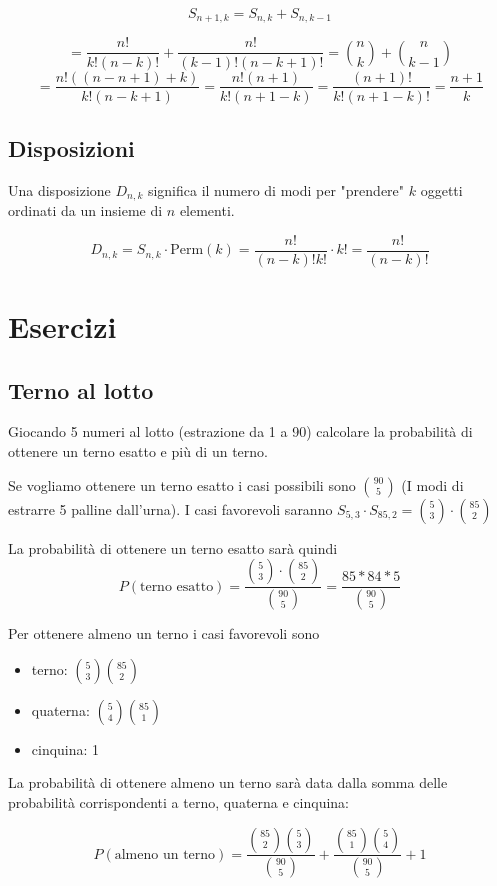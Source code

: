 \[ S_{n+1,k} = S_{n,k} + S_{n,k-1} \]

\[ = \dfrac{n!}{k!(n-k)!} + \dfrac{n!}{(k-1)!(n-k+1)!} = \binom{n}{k} + \binom{n}{k-1} \]
\[ = \dfrac{n!((n-n+1) + k)}{k!(n-k+1)} = \dfrac{n!(n+1)}{k!(n+1-k)} = \dfrac{(n+1)!}{k!(n+1-k)!} = \dfrac{n+1}{k} \]
\enddim

\subsection{Disposizioni}
Una disposizione $ D_{n,k} $ significa il numero di modi per "prendere" $ k $ oggetti ordinati da un insieme di $ n $ elementi.

\[ D_{n,k} = S_{n,k} \cdot \text{Perm}(k) = \dfrac{n!}{(n-k)!k!} \cdot k! = \dfrac{n!}{(n-k)!} \]

\section{Esercizi}

\subsection{Terno al lotto}
Giocando 5 numeri al lotto (estrazione da 1 a 90) calcolare la probabilità di ottenere un terno esatto e più di un terno.

Se vogliamo ottenere un terno esatto i casi possibili sono $ \binom{90}{5} $ (I modi di estrarre 5 palline dall'urna). I casi favorevoli saranno $ S_{5,3} \cdot S_{85,2} = \binom{5}{3} \cdot \binom{85}{2}$

La probabilità di ottenere un terno esatto sarà quindi
\[ P(\text{terno esatto}) = \dfrac{\binom{5}{3} \cdot \binom{85}{2}}{\binom{90}{5}} = \dfrac{85 * 84 * 5}{\binom{90}{5}} \]

Per ottenere almeno un terno i casi favorevoli sono
\begin{itemize}
	\item terno: $ \binom{5}{3} \binom{85}{2} $
	\item quaterna: $ \binom{5}{4} \binom{85}{1} $
	\item cinquina: 1
\end{itemize}

La probabilità di ottenere almeno un terno sarà data dalla somma delle probabilità corrispondenti a terno, quaterna e cinquina:

\[ P(\text{almeno un terno}) = \dfrac{\binom{85}{2} \binom{5}{3}}{\binom{90}{5}} + \dfrac{\binom{85}{1} \binom{5}{4}}{\binom{90}{5}} + 1 \]

